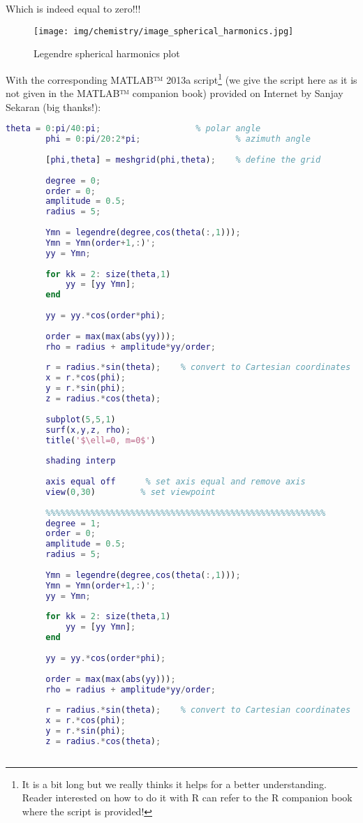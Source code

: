 	Which is indeed equal to zero!!!
 	\begin{figure}[H]
		\centering
		\texttt{[image: img/chemistry/image\_spherical\_harmonics.jpg]}	
		\caption{Legendre spherical harmonics plot}
	\end{figure}
	With the corresponding MATLAB™ 2013a script\footnote{It is a bit long but we really thinks it helps for a better understanding. Reader interested on how to do it with R can refer to the R companion book where the script is provided!} (we give the script here as it is not given in the MATLAB™ companion book) provided on Internet by Sanjay Sekaran (big thanks!):
	\begin{lstlisting}[language=MATLAB]
		theta = 0:pi/40:pi;                   % polar angle
		phi = 0:pi/20:2*pi;                   % azimuth angle
		
		[phi,theta] = meshgrid(phi,theta);    % define the grid
		
		degree = 0;
		order = 0;
		amplitude = 0.5;
		radius = 5;
		
		Ymn = legendre(degree,cos(theta(:,1)));
		Ymn = Ymn(order+1,:)';
		yy = Ymn;
		
		for kk = 2: size(theta,1)
		    yy = [yy Ymn];
		end
		
		yy = yy.*cos(order*phi);
		
		order = max(max(abs(yy)));
		rho = radius + amplitude*yy/order;
		
		r = radius.*sin(theta);    % convert to Cartesian coordinates
		x = r.*cos(phi);
		y = r.*sin(phi);
		z = radius.*cos(theta);
		
		subplot(5,5,1)
		surf(x,y,z, rho);
		title('$\ell=0, m=0$')
		
		shading interp
		
		axis equal off      % set axis equal and remove axis
		view(0,30)         % set viewpoint
		
		%%%%%%%%%%%%%%%%%%%%%%%%%%%%%%%%%%%%%%%%%%%%%%%%%%%%%%%%
		degree = 1;
		order = 0;
		amplitude = 0.5;
		radius = 5;
		
		Ymn = legendre(degree,cos(theta(:,1)));
		Ymn = Ymn(order+1,:)';
		yy = Ymn;
		
		for kk = 2: size(theta,1)
		    yy = [yy Ymn];
		end
		
		yy = yy.*cos(order*phi);
		
		order = max(max(abs(yy)));
		rho = radius + amplitude*yy/order;
		
		r = radius.*sin(theta);    % convert to Cartesian coordinates
		x = r.*cos(phi);
		y = r.*sin(phi);
		z = radius.*cos(theta);
		

\end{lstlisting}
